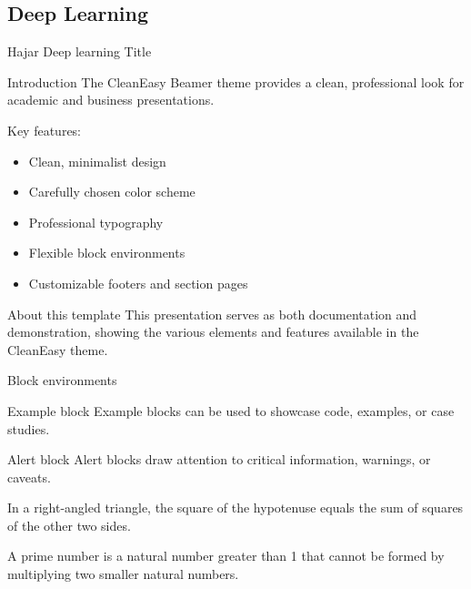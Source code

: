 \documentclass[aspectratio=169,xcolor=dvipsnames]{beamer}
\begin{document}
\subsection{Deep Learning}
\begin{frame}{Hajar Deep learning Title}
\end{frame}  
\begin{frame}{Introduction}
  The CleanEasy Beamer theme provides a clean, professional look for academic and business presentations.
  
  \vspace{0.3cm}
  
  Key features:
  \begin{itemize}
    \item Clean, minimalist design
    \item Carefully chosen color scheme
    \item Professional typography
    \item Flexible block environments
    \item Customizable footers and section pages
  \end{itemize}
  
  \begin{block}{About this template}
    This presentation serves as both documentation and demonstration, showing the various elements and features available in the CleanEasy theme.
  \end{block}
\end{frame}

\begin{frame}{Block environments}

  \begin{exampleblock}{Example block}
    Example blocks can be used to showcase code, examples, or case studies.
  \end{exampleblock}
  
  \begin{alertblock}{Alert block}
    Alert blocks draw attention to critical information, warnings, or caveats.
  \end{alertblock}
  
  \begin{theorem}
    In a right-angled triangle, the square of the hypotenuse equals the sum of squares of the other two sides.
  \end{theorem}
  
  \begin{definition}
    A prime number is a natural number greater than 1 that cannot be formed by multiplying two smaller natural numbers.
  \end{definition}
\end{frame}
\end{document}
